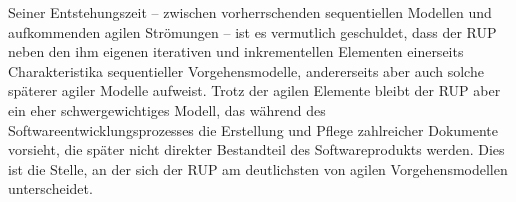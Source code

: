 Seiner Entstehungszeit – zwischen vorherrschenden sequentiellen Modellen und aufkommenden agilen Strömungen – ist es vermutlich geschuldet, dass der RUP neben den ihm eigenen iterativen und inkrementellen Elementen einerseits Charakteristika sequentieller Vorgehensmodelle, andererseits aber auch solche späterer agiler Modelle aufweist. Trotz der agilen Elemente bleibt der RUP aber ein eher 
schwergewichtiges Modell, das während des Softwareentwicklungsprozesses die Erstellung und Pflege zahlreicher Dokumente vorsieht, die später nicht direkter Bestandteil des Softwareprodukts werden. Dies ist die Stelle, an der sich der RUP am deutlichsten von agilen Vorgehensmodellen unterscheidet.